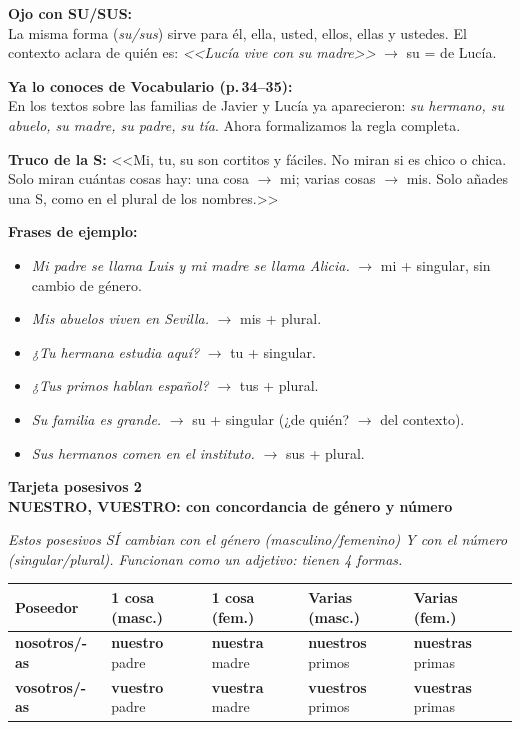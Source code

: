 \documentclass[a4paper,10pt]{article}
\newcommand{\posheader}[2]{%
  \noindent
  \colorbox{moradopos!90}{\parbox{\dimexpr\linewidth-2\fboxsep}{%
    \centering\color{white}\bfseries\large Tarjeta posesivos #1\\[2pt]
    \normalsize #2%
  }}
  \vspace{4pt}
}
\begin{document}
\vspace{4pt}
\textbf{Ojo con SU/SUS:}\\
La misma forma (\textit{su/sus}) sirve para él, ella, usted, ellos, ellas y ustedes. El contexto aclara de quién es: \textit{<<Lucía vive con su madre>>} $\to$ su = de Lucía.

\vspace{4pt}
\textbf{Ya lo conoces de Vocabulario (p.\,34--35):}\\
En los textos sobre las familias de Javier y Lucía ya aparecieron: \textit{su hermano, su abuelo, su madre, su padre, su tía}. Ahora formalizamos la regla completa.

\begin{trucoposesivo}
\textbf{Truco de la S:} <<Mi, tu, su son cortitos y fáciles. No miran si es chico o chica. Solo miran cuántas cosas hay: una cosa $\to$ mi; varias cosas $\to$ mis. Solo añades una S, como en el plural de los nombres.>>
\end{trucoposesivo}

\textbf{Frases de ejemplo:}
\begin{itemize}[nosep, leftmargin=1.2em]
\item \textit{Mi padre se llama Luis y mi madre se llama Alicia.} $\to$ mi + singular, sin cambio de género.
\item \textit{Mis abuelos viven en Sevilla.} $\to$ mis + plural.
\item \textit{¿Tu hermana estudia aquí?} $\to$ tu + singular.
\item \textit{¿Tus primos hablan español?} $\to$ tus + plural.
\item \textit{Su familia es grande.} $\to$ su + singular (¿de quién? $\to$ del contexto).
\item \textit{Sus hermanos comen en el instituto.} $\to$ sus + plural.
\end{itemize}

\newpage

\posheader{2}{NUESTRO, VUESTRO: con concordancia de género y número}

\vspace{4pt}
\small
\textit{Estos posesivos SÍ cambian con el género (masculino/femenino) Y con el número (singular/plural). Funcionan como un adjetivo: tienen 4 formas.}

\vspace{6pt}

\begin{center}
\begin{tabular}{|l|l|l|l|l|}
\hline
\rowcolor{moradopos!20}
\textbf{Poseedor} & \textbf{1 cosa (masc.)} & \textbf{1 cosa (fem.)} & \textbf{Varias (masc.)} & \textbf{Varias (fem.)} \\
\hline
\textbf{nosotros/-as} & \textbf{nuestro} padre & \textbf{nuestra} madre & \textbf{nuestros} primos & \textbf{nuestras} primas \\
\hline
\rowcolor{grisclaro}
\textbf{vosotros/-as} & \textbf{vuestro} padre & \textbf{vuestra} madre & \textbf{vuestros} primos & \textbf{vuestras} primas \\
\hline
\end{tabular}
\end{center}
\end{document}
